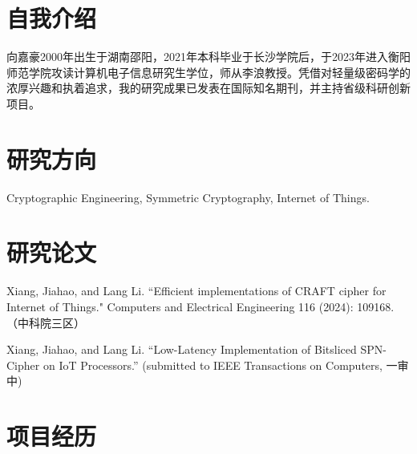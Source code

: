 \documentclass[11pt,a4paper,sans]{moderncv}
\begin{document}
\renewcommand*{\footrulewidth}{0pt}
\cfoot{}
\rfoot{\today}

\makecvtitle

\section{自我介绍}
向嘉豪2000年出生于湖南邵阳，2021年本科毕业于长沙学院后，于2023年进入衡阳师范学院攻读计算机电子信息研究生学位，师从李浪教授。凭借对轻量级密码学的浓厚兴趣和执着追求，我的研究成果已发表在国际知名期刊，并主持省级科研创新项目。

\section{研究方向}
Cryptographic Engineering, Symmetric Cryptography, Internet of Things.

\section{研究论文}
Xiang, Jiahao, and Lang Li. ``Efficient implementations of CRAFT cipher for Internet of Things." Computers and Electrical Engineering 116 (2024): 109168. （中科院三区）

Xiang, Jiahao, and Lang Li. ``Low-Latency Implementation of Bitsliced SPN-Cipher on IoT Processors.'' (submitted to IEEE Transactions on Computers, 一审中)

\section{项目经历}
\end{document}
